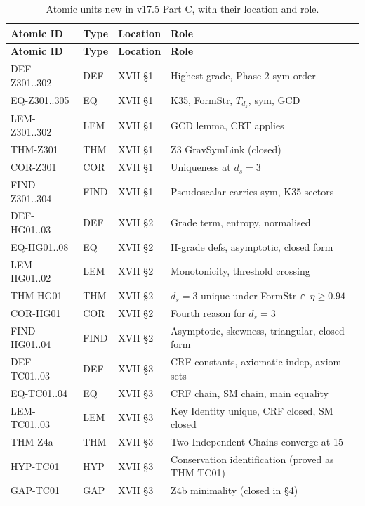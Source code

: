 \documentclass[12pt, a4paper]{article}
\begin{document}
\begin{center}
{\footnotesize
\renewcommand{\arraystretch}{1.20}
\begin{longtable}{p{3.5cm} p{2.0cm} p{2.5cm} p{4.5cm}}
\caption{Atomic units new in v17.5 Part C, with their location and role.}\\
\toprule
\textbf{Atomic ID} & \textbf{Type} & \textbf{Location} &
\textbf{Role} \\
\midrule
\endfirsthead
\toprule
\textbf{Atomic ID} & \textbf{Type} & \textbf{Location} &
\textbf{Role} \\
\midrule
\endhead
\bottomrule
\endlastfoot
DEF-Z301..302   & DEF & XVII §1 & Highest grade, Phase-2 sym order \\
EQ-Z301..305    & EQ  & XVII §1 & K35, FormStr, $T_{d_s}$, sym, GCD \\
LEM-Z301..302   & LEM & XVII §1 & GCD lemma, CRT applies \\
THM-Z301        & THM & XVII §1 & Z3 GravSymLink (closed) \\
COR-Z301        & COR & XVII §1 & Uniqueness at $d_s=3$ \\
FIND-Z301..304  & FIND & XVII §1 & Pseudoscalar carries sym, K35 sectors \\
\midrule
DEF-HG01..03    & DEF & XVII §2 & Grade term, entropy, normalised \\
EQ-HG01..08     & EQ  & XVII §2 & H-grade defs, asymptotic, closed form \\
LEM-HG01..02    & LEM & XVII §2 & Monotonicity, threshold crossing \\
THM-HG01        & THM & XVII §2 & $d_s=3$ unique under FormStr ∩ $\eta\geq 0.94$ \\
COR-HG01        & COR & XVII §2 & Fourth reason for $d_s=3$ \\
FIND-HG01..04   & FIND & XVII §2 & Asymptotic, skewness, triangular, closed form \\
\midrule
DEF-TC01..03    & DEF & XVII §3 & CRF constants, axiomatic indep, axiom sets \\
EQ-TC01..04     & EQ  & XVII §3 & CRF chain, SM chain, main equality \\
LEM-TC01..03    & LEM & XVII §3 & Key Identity unique, CRF closed, SM closed \\
THM-Z4a         & THM & XVII §3 & Two Independent Chains converge at 15 \\
HYP-TC01        & HYP & XVII §3 & Conservation identification (proved as THM-TC01) \\
GAP-TC01        & GAP & XVII §3 & Z4b minimality (closed in §4) \\

\end{longtable}}
\end{center}
\end{document}
